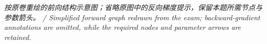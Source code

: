 



\emph{按原卷重绘的前向结构示意图；省略原图中的反向梯度提示，保留本题所需节点与参数箭头。 / Simplified forward graph redrawn from the exam; backward-gradient annotations are omitted, while the required nodes and parameter arrows are retained.}
